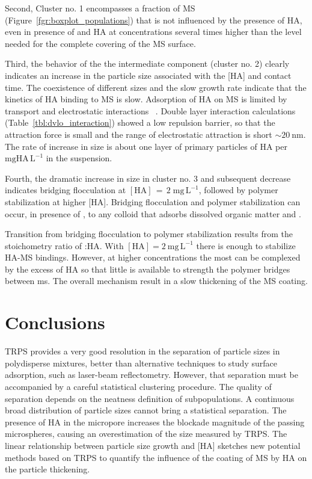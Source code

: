 \documentclass[journal=langd5,manuscript=article]{achemso}
\begin{document}
Second, Cluster no. 1 encompasses a fraction of MS (Figure~\ref{fgr:boxplot_populations}) that is not influenced by the presence of HA, even in presence of  and HA at concentrations several times higher than the level needed for the complete covering of the MS surface.


Third, the behavior of the the intermediate component (cluster no. 2) clearly indicates an increase in the particle size associated with the [HA] and
contact time. The coexistence of different sizes and the
slow  growth rate indicate that the kinetics of HA binding
to MS is slow. Adsorption of HA on MS is limited by
transport and electrostatic interactions~ \cite{doi:10.1021/es981236u}.
Double layer interaction calculations (Table~\ref{tbl:dvlo_interaction}) showed a low  repulsion barrier,
so that the attraction force is small and the range of electrostatic attraction is short $\sim 20~\mathrm{nm}$.
The rate of increase in size is about one  layer of primary particles of HA per $\mathrm{mg HA\,L^{-1}}$ in the suspension.

Fourth, the dramatic increase in size in cluster no. 3 
and subsequent decrease indicates bridging flocculation at 
$\mathrm{[HA] \,=\, 2\;mg\,L^{-1}}$, followed by polymer stabilization at higher [HA]. %
Bridging flocculation and polymer stabilization can occur, in presence of , to any colloid that adsorbs dissolved organic matter and .

Transition from bridging flocculation to polymer stabilization results from the stoichometry ratio of 
:HA.
With 
$\mathrm{[HA]} = 2~\mathrm{mg\,L^{-1}}$ there is enough 
 to stabilize HA-MS bindings. However, at higher concentrations
the most
can be  complexed by the excess of HA  so that little
is available to strength the polymer bridges between ms.
The overall mechanism  result in a slow thickening of the MS coating. 

\section{Conclusions}


TRPS provides a very good resolution in the separation  of particle sizes in polydisperse mixtures, better than alternative techniques to study surface adsorption, such as laser-beam reflectometry. However, that separation must be accompanied by a careful statistical clustering procedure. The quality of separation depends on the neatness definition of subpopulations. A continuous broad distribution of particle sizes cannot bring a statistical separation.
The presence of HA in the micropore increases the blockade magnitude of the passing microspheres, causing an overestimation of the size measured by TRPS.  The linear relationship  between particle size growth and [HA] sketches new potential methods based on TRPS to quantify the influence of the coating of MS by HA on the particle thickening.
\end{document}
